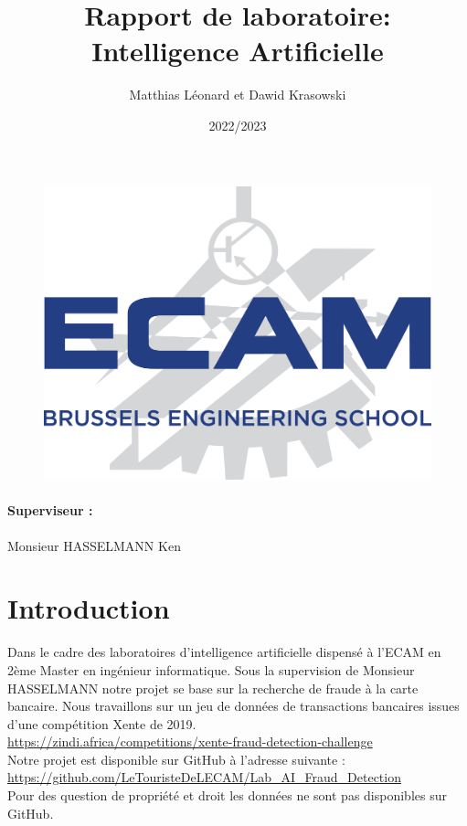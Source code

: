 \documentclass{article}
\title{Rapport de laboratoire: \\Intelligence Artificielle}
\author{Matthias Léonard et Dawid Krasowski}
\date{2022/2023}
\begin{document}
\maketitle

\begin{figure}[h]
    \centering
    \includegraphics[scale=0.15]{./images/Logo ECAM.png}

\end{figure}


\paragraph{Superviseur :} Monsieur HASSELMANN Ken



\pagebreak
\tableofcontents
\pagebreak
\section{Introduction}

    Dans le cadre des laboratoires d'intelligence artificielle dispensé à l'ECAM en 2ème Master en ingénieur informatique.
Sous la supervision de Monsieur HASSELMANN notre projet se base sur la recherche de fraude à la carte bancaire.
Nous travaillons sur un jeu de données de transactions bancaires issues d'une compétition Xente de 2019.\\ \url{https://zindi.africa/competitions/xente-fraud-detection-challenge} \\

Notre projet est disponible sur GitHub à l'adresse suivante :\\ \url{https://github.com/LeTouristeDeLECAM/Lab_AI_Fraud_Detection} \\
Pour des question de propriété et droit les données ne sont pas disponibles sur GitHub.
\end{document}
